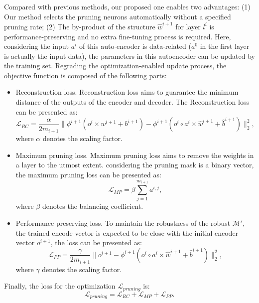  Compared with previous methods, our proposed one enables two advantages: (1) Our method selects the pruning neurons automatically without a specified pruning rate; (2) The by-product of the structure $\hat{w}^{i+1}$ for layer $l^i$ is performance-preserving and no extra fine-tuning process is required. Here, considering the input $a^i$ of this auto-encoder is data-related ($a^0$ in the first layer is actually the input data), the parameters in this autoencoder can be updated by the training set. Regrading the optimization-enabled update process, the objective function is composed of the following parts:
\begin{itemize}
    \item Reconstruction loss. Reconstruction loss aims to guarantee the minimum distance of the outputs of the encoder and decoder. The Reconstruction loss can be presented as:
    \begin{equation}\label{eq:reconstruction_loss}
        \mathcal{L}_{RC} =  
     \frac{\alpha}{2m_{i+1}}\|\phi^{i+1}(o^i\times w^{i+1}+b^{i+1}) - \phi^{i+1}(o^i\circ a^i\times \hat{w}^{i+1}+\hat{b}^{i+1})\|^2_2,
    \end{equation}
    where $\alpha$ denotes the scaling factor.
    \item Maximum pruning loss. Maximum pruning loss aims to remove the weights in a layer to the utmost extent. considering the pruning mask is a binary vector, the maximum pruning loss can be presented as:
    \begin{equation}
        \mathcal{L}_{MP} = \beta \sum_{j=1}^{m_{i+1}} a^{i,j},
    \end{equation}
    where $\beta$ denotes the balancing coefficient.
    \item Performance-preserving loss. To maintain the robustness of the robust $\mathcal{M}'$, the trained encode vector is expected to be close with the initial encoder vector $o^{i+1}$, the loss can be presented as:
    \begin{equation}
        \mathcal{L}_{PP} =  \frac{\gamma}{2m_{i+1}}\|o^{i+1} - \phi^{i+1}(o^i\circ a^i\times \hat{w}^{i+1}+\hat{b}^{i+1})\|^2_2,
    \end{equation}
    where $\gamma$ denotes the scaling factor.
\end{itemize}

Finally, the loss for the optimization $\mathcal{L}_{pruning}$ is:
\begin{equation}
    \mathcal{L}_{pruning} = \mathcal{L}_{RC}+\mathcal{L}_{MP}+\mathcal{L}_{PP}.
\end{equation}

